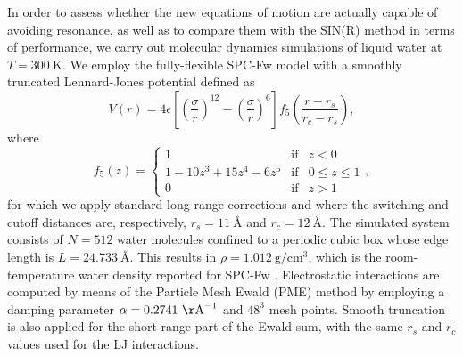\documentclass[
aip,
jcp,
reprint,
]{revtex4-1}
\begin{document}
In order to assess whether the new equations of motion are actually capable of avoiding resonance, as well as to compare them with the SIN(R) method in terms of performance, we carry out molecular dynamics simulations of liquid water at $T = 300~\mathrm{K}$.
We employ the fully-flexible SPC-Fw model \cite{Wu_2006a} with a smoothly truncated Lennard-Jones potential defined as
\begin{equation*}
V(r) = 4 \epsilon \left[\left(\frac{\sigma}{r}\right)^{12} - \left(\frac{\sigma}{r}\right)^{6}\right] f_5\left(\frac{r-r_s}{r_c - r_s}\right),
\end{equation*}
where
\begin{equation*}
\label{eq:swithing function}
f_5(z) = \left\{\begin{array}{ccc}
1 & \text{if} & z < 0 \\
1 - 10 z^3 + 15 z^4 - 6 z^5 & \text{if} & 0 \leq z \leq 1 \\
0 & \text{if} & z > 1
\end{array}\right.,
\end{equation*}
for which we apply standard long-range corrections \cite{Tuckerman_2010} and where the switching and cutoff distances are, respectively, $r_s = 11~\text{\AA}$ and $r_c = 12~\text{\AA}$.
The simulated system consists of $N=512$ water molecules confined to a periodic cubic box whose edge length is $L = 24.733~\text{\AA}$.
This results in $\rho = 1.012~\mathrm{g/cm^3}$, which is the room-temperature water density reported for SPC-Fw \cite{Wu_2006a}.
Electrostatic interactions are computed by means of the Particle Mesh Ewald (PME) method \cite{Darden_1993} by employing a damping parameter $\alpha = 0.2741~\mathrm{\AA}^{-1}$ and $48^3$ mesh points.
Smooth truncation is also applied for the short-range part of the Ewald sum, with the same $r_s$ and $r_c$ values used for the LJ interactions.
\end{document}
